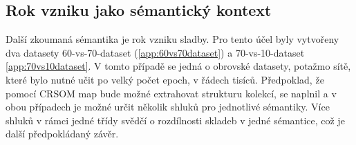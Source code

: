 \documentclass[thesis=M,czech]{FITthesis}[2012/06/26]
\begin{document}


\subsection{Rok vzniku jako sémantický kontext}
Další zkoumaná sémantika je rok vzniku sladby. Pro tento účel byly vytvořeny dva datasety 60-vs-70-dataset (\ref{app:60vs70dataset}) a 70-vs-10-dataset \ref{app:70vs10dataset}. V tomto případě se jedná o obrovské datasety, potažmo sítě, které bylo nutné učit po velký počet epoch, v řádech tisíců. Předpoklad, že pomocí CRSOM map bude možné extrahovat strukturu kolekcí, se naplnil a v obou případech je možné určit několik shluků pro jednotlivé sémantiky. Více shluků v rámci jedné třídy svědčí o rozdílnosti skladeb v jedné sémantice, což je další předpokládaný závěr.
\end{document}
